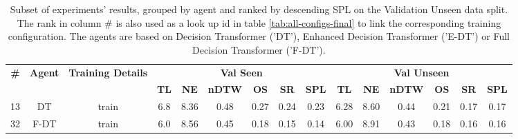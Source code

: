 \begin{table}
\centering
\caption{\label{tab:spatial_features}Subset of experiments' results, grouped by agent and ranked by descending SPL on the Validation Unseen data split. The rank in column \# is also used as a look up id in table \ref{tab:all-configs-final} to link the corresponding training configuration.     \newline The agents are based on Decision Transformer ('DT'), Enhanced Decision Transformer ('E-DT') or Full Decision Transformer ('F-DT').}
\begin{tabular}{@{\hskip3pt}c@{\hskip3pt}c@{\hskip3pt}c@{\hskip3pt}c@{\hskip3pt}c@{\hskip3pt}c@{\hskip3pt}c@{\hskip3pt}c@{\hskip3pt}c@{\hskip3pt}c@{\hskip3pt}c@{\hskip3pt}c@{\hskip3pt}c@{\hskip3pt}c@{\hskip3pt}c}
\toprule
\textbf{\#} & \textbf{Agent} & \textbf{Training Details} & \multicolumn{6}{c}{\textbf{Val Seen}} & \multicolumn{6}{c}{\textbf{Val Unseen}} \\
 \textbf{~} &     \textbf{~} &                \textbf{~} &       \textbf{TL} & \textbf{NE} & \textbf{nDTW} & \textbf{OS} & \textbf{SR} & \textbf{SPL} &         \textbf{TL} & \textbf{NE} & \textbf{nDTW} & \textbf{OS} & \textbf{SR} & \textbf{SPL} \\
\midrule
         13 &             DT &                     train &               6.8 &        8.36 &          0.48 &        0.27 &        0.24 &         0.23 &                6.28 &        8.60 &          0.44 &        0.21 &        0.17 &         0.17 \\
         32 &           F-DT &                     train &               6.0 &        8.56 &          0.45 &        0.18 &        0.15 &         0.14 &                6.00 &        8.91 &          0.43 &        0.18 &        0.16 &         0.16 \\
\bottomrule
\end{tabular}
\end{table}
